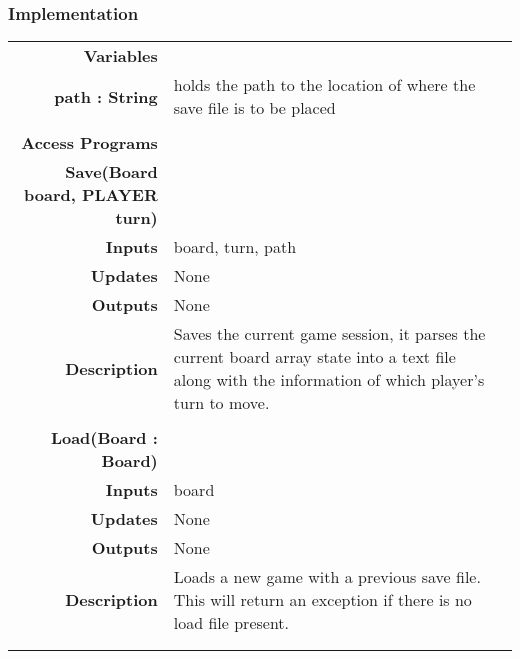 \documentclass[10pt]{article}
\begin{document}
    \subsubsection{Implementation}
        \begin{tabularx}{\linewidth}{ >{\bfseries}r Xp{5cm} }
            Variables       & \begin{tabular}[t]{@{} l p{8cm}} 
                                     & \\
                                    path : String & holds the path to the location of where the save file is to be placed \\
                              \end{tabular} \\

            Access Programs & \begin{tabular}[t]{@{} p{4cm} p{8cm}} 
                                     & \\
                                    \bf{Save(Board board, PLAYER turn)} & \\
                                    Inputs &  board, turn, path \\
                                    Updates & None \\
                                    Outputs & None \\
                                    Description & Saves the current game session, it parses the current board array state into a text file along with the information of which player's turn to move. \\
                                     & \\
                                    \bf{Load(Board : Board)} & \\
                                    Inputs & board \\
                                    Updates & None \\ 
                                    Outputs & None \\
                                    Description & Loads a new game with a previous save file. This will return an exception if there is no load file present.\\
                                     & \\
                              \end{tabular} \\
               
                                          
        \end{tabularx}
        
\end{document}
